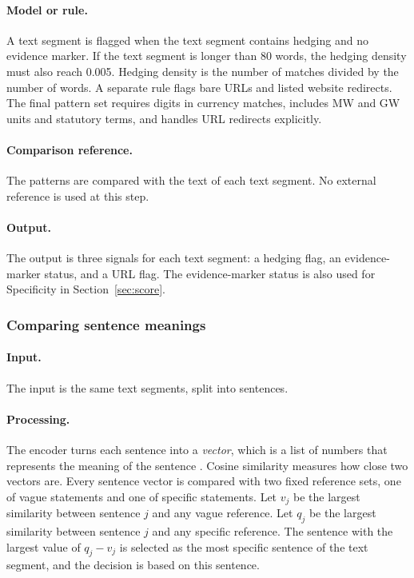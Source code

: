 \paragraph{Model or rule.} A text segment is flagged when the text segment contains hedging and no evidence marker. If the text segment is longer than 80 words, the hedging density must also reach 0.005. Hedging density is the number of matches divided by the number of words. A separate rule flags bare URLs and listed website redirects. The final pattern set requires digits in currency matches, includes MW and GW units and statutory terms, and handles URL redirects explicitly.

\paragraph{Comparison reference.} The patterns are compared with the text of each text segment. No external reference is used at this step.

\paragraph{Output.} The output is three signals for each text segment: a hedging flag, an evidence-marker status, and a URL flag. The evidence-marker status is also used for Specificity in Section~\ref{sec:score}.

\subsubsection{Comparing sentence meanings}

\paragraph{Input.} The input is the same text segments, split into sentences.

\paragraph{Processing.} The  encoder turns each sentence into a \emph{vector}, which is a list of numbers that represents the meaning of the sentence \cite{reimers2019,song2020}. Cosine similarity measures how close two vectors are. Every sentence vector is compared with two fixed reference sets, one of vague statements and one of specific statements. Let $v_j$ be the largest similarity between sentence $j$ and any vague reference. Let $q_j$ be the largest similarity between sentence $j$ and any specific reference. The sentence with the largest value of $q_j-v_j$ is selected as the most specific sentence of the text segment, and the decision is based on this sentence.


